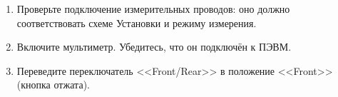 \begin{enumerate}

\item Проверьте подключение измерительных проводов: оно должно соответствовать схеме Установки и режиму измерения.
\item Включите мультиметр. Убедитесь, что он подключён к ПЭВМ.
\item Переведите переключатель <<Front/Rear>> в положение <<Front>> (кнопка отжата). 

\end{enumerate}
